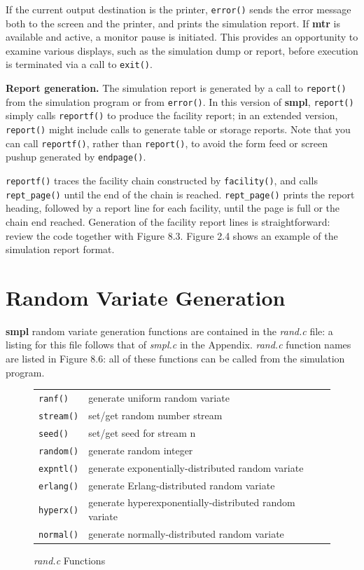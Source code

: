 If the current output destination is the printer, \texttt{error()} sends the error
message both to the screen and the printer, and prints the simulation report.
If \textbf{mtr} is available and active, a monitor pause is initiated. This provides an
opportunity to examine various displays, such as the simulation dump or
report, before execution is terminated via a call to \texttt{exit()}.

\textbf{Report generation.} The simulation report is generated by a call to
\texttt{report()} from the simulation program or from \texttt{error()}. In this version of
\textbf{smpl}, \texttt{report()} simply calls \texttt{reportf()} to produce the facility report; in
an extended version, \texttt{report()} might include calls to generate table or
storage reports. Note that you can call \texttt{reportf()}, rather than \texttt{report()},
to avoid the form feed or screen pushup generated by \texttt{endpage()}.

\texttt{reportf()} traces the facility chain constructed by \texttt{facility()}, and
calls \texttt{rept\_page()} until the end of the chain is reached. \texttt{rept\_page()}
prints the report heading, followed by a report line for each facility, until
the page is full or the chain end reached. Generation of the facility report
lines is straightforward: review the code together with Figure 8.3. Figure
2.4 shows an example of the simulation report format.

\section{Random Variate Generation}

\textbf{smpl} random variate generation functions are contained in the \textit{rand.c}
file: a listing for this file follows that of \textit{smpl.c} in the Appendix. \textit{rand.c}
function names are listed in Figure 8.6: all of these functions can be called
from the simulation program.


\begin{figure}[H]
\centering\small
\begin{tabular}{@{}lp{}@{}}
\texttt{ranf()} & generate uniform random variate\\
\texttt{stream()} & set/get random number stream\\
\texttt{seed()} & set/get seed for stream n\\
\texttt{random()} & generate random integer\\
\texttt{expntl()} & generate exponentially-distributed random variate\\
\texttt{erlang()} & generate Erlang-distributed random variate\\
\texttt{hyperx()} & generate hyperexponentially-distributed random variate\\
\texttt{normal()} & generate normally-distributed random variate
\end{tabular}
\caption{\textit{rand.c} Functions}
\end{figure}

